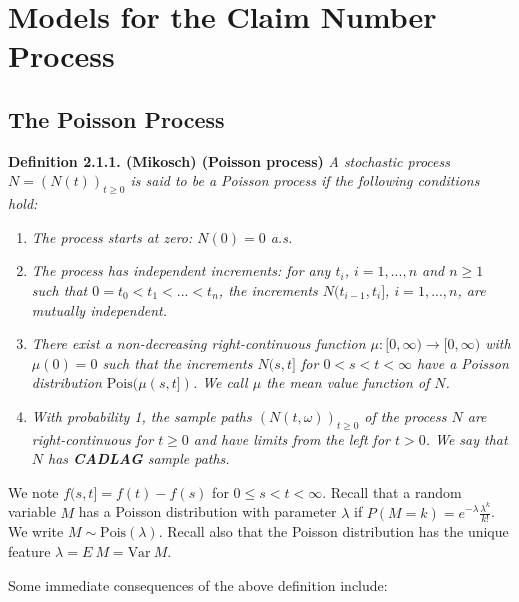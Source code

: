\documentclass[a4paper,12pt,openany]{book}
\providecommand{\tightlist}{%
 \setlength{\itemsep}{0pt}\setlength{\parskip}{0pt}}
\begin{document}
\hypertarget{models-for-the-claim-number-process}{%
\section{Models for the Claim Number Process}\label{models-for-the-claim-number-process}}

\hypertarget{the-poisson-process}{%
\subsection{The Poisson Process}\label{the-poisson-process}}

\textbf{Definition 2.1.1. (Mikosch) (Poisson process)} \emph{A stochastic process \(N=(N(t))_{t\ge 0}\) is said to be a Poisson process if the following conditions hold:}

\begin{enumerate}
\def\labelenumi{(\arabic{enumi})}
\tightlist
\item
  \emph{The process starts at zero: \(N(0)=0\) a.s.}
\item
  \emph{The process has independent increments: for any \(t_i\), \(i=1,...,n\) and \(n\ge 1\) such that \(0=t_0<t_1<...<t_n\), the increments \(N(t_{i-1},t_i]\), \(i=1,...,n\), are mutually independent.}
\item
  \emph{There exist a non-decreasing right-continuous function \(\mu : [0,\infty)\to [0,\infty)\) with \(\mu(0)=0\) such that the increments \(N(s,t]\) for \(0<s<t<\infty\) have a Poisson distribution \(\text{Pois}(\mu(s,t])\). We call \(\mu\) the mean value function of \(N\).}
\item
  \emph{With probability 1, the sample paths \((N(t,\omega))_{t\ge 0}\) of the process \(N\) are right-continuous for \(t \ge 0\) and have limits from the left for \(t > 0\). We say that \(N\) has \textbf{CADLAG} sample paths.}
\end{enumerate}

We note \(f(s,t]=f(t)-f(s)\) for \(0\le s<t<\infty\). Recall that a random variable \(M\) has a Poisson distribution with parameter \(\lambda\) if \(P(M=k)=e^{-\lambda}\frac{\lambda^k}{k!}\). We write \(M\sim \text{Pois}(\lambda)\). Recall also that the Poisson distribution has the unique feature \(\lambda = E\ M=\text{Var}\ M\).

Some immediate consequences of the above definition include:
\end{document}

